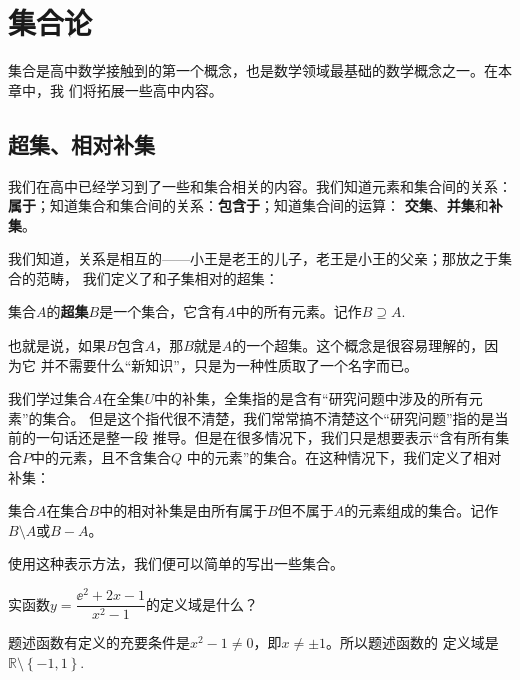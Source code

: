 \chapter{集合论} \label{chap:set}

集合是高中数学接触到的第一个概念，也是数学领域最基础的数学概念之一。在本章中，我
们将拓展一些高中内容。

\section{超集、相对补集}

我们在高中已经学习到了一些和集合相关的内容。我们知道元素和集合间的关系：
\textbf{属于}；知道集合和集合间的关系：\textbf{包含于}；知道集合间的运算：
\textbf{交集}、\textbf{并集}和\textbf{补集}。

我们知道，关系是相互的——小王是老王的儿子，老王是小王的父亲；那放之于集合的范畴，
我们定义了和子集相对的超集：

\begin{rawdef}[超集]
    集合$A$的\textbf{超集}$B$是一个集合，它含有$A$中的所有元素。记作$B \supseteq 
    A$.
\end{rawdef}

也就是说，如果$B$包含$A$，那$B$就是$A$的一个超集。这个概念是很容易理解的，因为它
并不需要什么“新知识”，只是为一种性质取了一个名字而已。

我们学过集合$A$在全集$U$中的补集，全集指的是含有“研究问题中涉及的所有元素”的集合。
但是这个指代很不清楚，我们常常搞不清楚这个“研究问题”指的是当前的一句话还是整一段
推导。但是在很多情况下，我们只是想要表示“含有所有集合$P$中的元素，且不含集合$Q$
中的元素”的集合。在这种情况下，我们定义了相对补集：

\begin{rawdef}[相对补集]
    集合$A$在集合$B$中的相对补集是由所有属于$B$但不属于$A$的元素组成的集合。记作
    $B\setminus A$或$B - A$。
\end{rawdef}

使用这种表示方法，我们便可以简单的写出一些集合。

\begin{rawexp}
    实函数$y = \dfrac{\ee^2+2x-1}{x^2-1}$的定义域是什么？
\end{rawexp}

\begin{rawsol}
    题述函数有定义的充要条件是$x^2 -1 \neq 0$，即$x \neq \pm 1$。所以题述函数的
    定义域是$\mathbb{R}\setminus \left\{ -1,1 \right\}$.
\end{rawsol}

